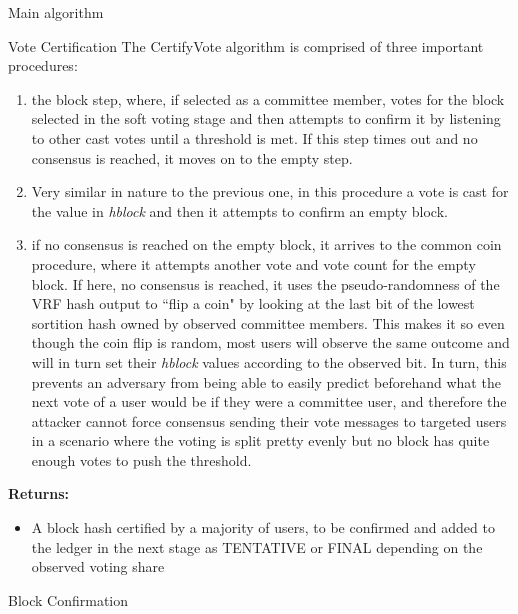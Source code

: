 \documentclass[10pt,a4paper]{article}
\begin{document}
\begin{section}{Main algorithm}
\begin{subsection}{Vote Certification}
The {\sf CertifyVote} algorithm is comprised of three important procedures: 
\begin{enumerate}
    \item the block step, where, if selected as a committee member, votes for the block selected in 
    the soft voting stage and then attempts to confirm it by listening to other cast votes until a 
    threshold is met. If this step times out and no consensus is reached, it moves on to the empty 
    step. 
    \item Very similar in nature to the previous one, in this procedure a vote is cast for the 
    value in {\em hblock} and then it attempts to confirm an empty block.
    \item if no consensus is reached on the empty block, it arrives to the common coin procedure, 
    where it attempts another vote and vote count for the empty block. 
    If here, no consensus is reached, it uses the pseudo-randomness of the VRF hash output to ``flip a coin" 
    by looking at the last bit of the lowest sortition hash owned by observed committee members.
    This makes it so even though the coin flip is random, most users will observe the same outcome and will 
    in turn set their {\em hblock} values according to the observed bit. 
    In turn, this prevents an adversary from being able to easily predict beforehand what the next vote 
    of a user would be if they were a committee user, and therefore the attacker cannot force consensus 
    sending their vote messages to targeted users in a scenario where the voting is split pretty evenly 
    but no block has quite enough votes to push the threshold.
\end{enumerate}

\noindent \textbf{Returns:}
\begin{itemize}
    \item A block hash certified by a majority of users, to be confirmed and added to the ledger in the next stage as TENTATIVE or FINAL depending
    on the observed voting share
  \end{itemize}


\end{subsection}
\begin{subsection}{Block Confirmation}\label{ssect:blockconfirmation}

\begin{algorithm}[H]
    \begin{algorithmic}[H]


\end{algorithmic}
\end{algorithm}
\end{subsection}
\end{section}
\end{document}
